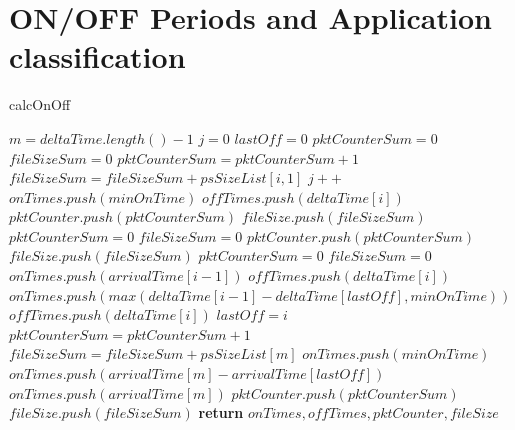 \section{ON/OFF Periods and Application classification}

	
\begin{algorithm}[ht!]
	\caption{calcOnOff}
	\label{alg:calcOnOff}
	\begin{algorithmic}[1]
		\small
		\State $m = deltaTime.length() - 1$
		\State $j = 0$
		\State $lastOff = 0$
		\State $pktCounterSum = 0$
		\State $fileSizeSum = 0$
		\State $pktCounterSum = pktCounterSum + 1$
		\State $fileSizeSum = fileSizeSum + psSizeList[i, 1]$
		 
		\State $j++$
		\State $onTimes.push(minOnTime)$
		\State $offTimes.push(deltaTime[i])$
		\State $pktCounter.push(pktCounterSum)$
		\State $fileSize.push(fileSizeSum)$
		\State $pktCounterSum = 0$
		\State $fileSizeSum = 0$
		\Else {} 
		\State $pktCounter.push(pktCounterSum)$
		\State $fileSize.push(fileSizeSum)$
		\State $pktCounterSum = 0$
		\State $fileSizeSum = 0$
		\State $onTimes.push(arrivalTime[i - 1])$
		\State $offTimes.push(deltaTime[i])$
		\Else {} 
		\State  $onTimes.push(max(deltaTime[i-1] - deltaTime[lastOff], minOnTime))$ 
		\State  $offTimes.push(deltaTime[i])$
		\EndIf
		\State $lastOff = i$
		\EndIf 
		\EndIf       
		\EndFor
		\State $pktCounterSum = pktCounterSum + 1$
		\State $fileSizeSum = fileSizeSum + psSizeList[m]$
		 
		\State $onTimes.push(minOnTime)$ %
		\Else {}
		\State $onTimes.push(arrivalTime[m] - arrivalTime[lastOff])$ 
		\Else 
		\State $onTimes.push(arrivalTime[m])$ 
		\EndIf
		\EndIf
		\State $pktCounter.push(pktCounterSum)$
		\State $fileSize.push(fileSizeSum)$
		\State \textbf{return} $onTimes, offTimes, pktCounter, fileSize$
		\EndFunction
	\end{algorithmic}
\end{algorithm}
	

